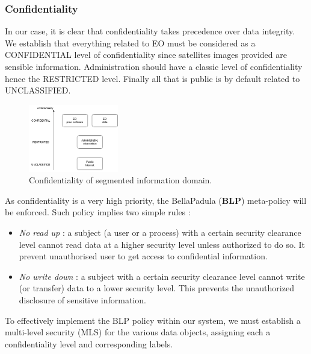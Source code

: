 \documentclass[12pt]{article}
\begin{document}
\subsubsection*{Confidentiality}
In our case, it is clear that confidentiality takes precedence over data integrity. 
We establish that everything related to EO must be considered as a CONFIDENTIAL level of confidentiality since satellites images provided are sensible information. Administration should have a classic level of confidentiality hence the RESTRICTED level. Finally all that is public is by default related to UNCLASSIFIED.

\begin{figure}[h]
    \centering
    \includegraphics[width=0.35\textwidth]{Figures/Solutions/classification_conf.png}
    \caption{Confidentiality of segmented information domain.}
\end{figure}

As confidentiality is a very high priority, the BellaPadula (\textbf{BLP}) meta-policy will be enforced. Such policy implies two simple rules : 
\begin{itemize}
    \item \textit{No read up} : a subject (a user or a process) with a certain security clearance level cannot read data at a higher security level unless authorized to do so. It prevent unauthorised user to get access to confidential information.
    \item \textit{No write down} :  a subject with a certain security clearance level cannot write (or transfer) data to a lower security level. This prevents the unauthorized disclosure of sensitive information.
\end{itemize}

To effectively implement the BLP policy within our system, we must establish a multi-level security (MLS) for the various data objects, assigning each a confidentiality level and corresponding labels.
\end{document}
